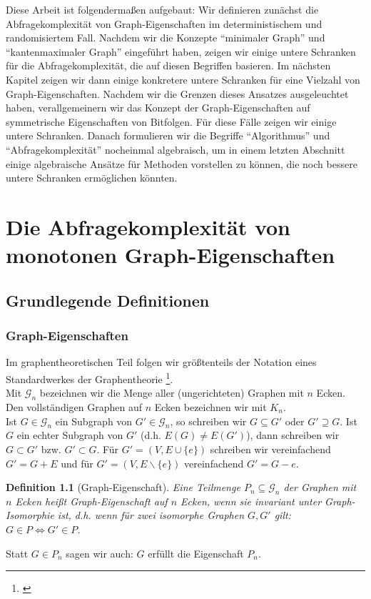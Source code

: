\documentclass[10pt,a4paper]{scrreprt}
\newtheorem{definition}{Definition}
\theoremstyle{definition}
\begin{document}
Diese Arbeit ist folgendermaßen aufgebaut:
Wir definieren zunächst die Abfragekomplexität
von Graph-Eigenschaften im deterministischem und
randomisiertem Fall. Nachdem wir die Konzepte
"`minimaler Graph"' und "`kantenmaximaler Graph"'
eingeführt haben, zeigen wir einige untere Schranken
für die Abfragekomplexität, die auf diesen Begriffen
basieren. Im nächsten Kapitel zeigen wir dann einige
konkretere untere Schranken für eine Vielzahl von
Graph-Eigenschaften. Nachdem wir die Grenzen 
dieses Ansatzes ausgeleuchtet haben, verallgemeinern
wir das Konzept der Graph-Eigenschaften auf 
symmetrische Eigenschaften von Bitfolgen. Für
diese Fälle zeigen wir einige untere Schranken.
Danach formulieren wir die Begriffe "`Algorithmus"'
und "`Abfragekomplexität"' nocheinmal algebraisch, um
in einem letzten Abschnitt
einige algebraische Ansätze für Methoden vorstellen zu
können, die noch bessere untere Schranken ermöglichen könnten.

\chapter{Die Abfragekomplexität von monotonen Graph-Eigenschaften}
\section{Grundlegende Definitionen}
\subsection{Graph-Eigenschaften}
Im graphentheoretischen Teil folgen wir größtenteils
der Notation eines Standardwerkes der Graphentheorie \footnote{\cite{diestel}}. \\
Mit $\mathcal{G}_n$ bezeichnen wir die Menge aller
(ungerichteten) Graphen mit $n$ Ecken. \\
Den vollständigen Graphen auf $n$ Ecken bezeichnen wir
mit $K_n$. \\
Ist $G \in \mathcal{G}_n$ ein Subgraph von $G' \in \mathcal{G}_n$,
so schreiben wir $G \subseteq G'$ oder $G' \supseteq G$. Ist $G$ ein
echter Subgraph von $G'$ (d.h. $E(G) \neq E(G')$), dann schreiben
wir $G \subset G'$ bzw. $G' \subset G$.
Für $G' = (V, E \cup \{e\})$ schreiben wir vereinfachend
$G' = G + E$ und für $G' = (V, E \backslash \{e\})$ vereinfachend
$G' = G - e$.


\begin{definition}[Graph-Eigenschaft]
Eine Teilmenge $P_n \subseteq \mathcal{G}_n$ der Graphen mit
$n$ Ecken heißt \emph{Graph-Eigenschaft auf $n$ Ecken},
wenn sie invariant unter Graph-Isomorphie ist,
d.h. wenn für zwei isomorphe Graphen $G, G'$ gilt:
$G \in P \iff G' \in P$.
\end{definition}
Statt $G \in P_n$ sagen wir auch: $G$ erfüllt die Eigenschaft $P_n$.
\end{document}
